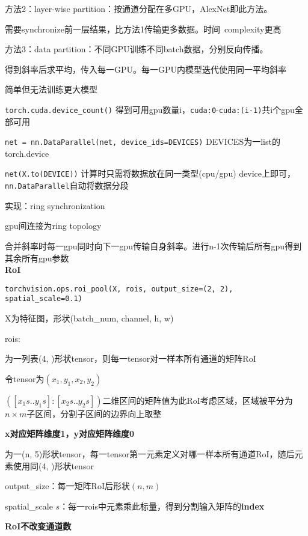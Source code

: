 \documentclass[UTF8]{ctexart}
\begin{document}
  方法2：layer-wise partition：按通道分配在多GPU，AlexNet即此方法。
  
  \quad 需要synchronize前一层结果，比方法1传输更多数据。时间\ complexity更高

  方法3：data partition：不同GPU训练不同batch数据，分别反向传播。

  \quad 得到斜率后求平均，传入每一GPU。每一GPU内模型迭代使用同一平均斜率
  
  \quad 简单但无法训练更大模型

  \quad \texttt{torch.cuda.device\_count()} 得到可用gpu数量i，\texttt{cuda:0}-\texttt{cuda:(i-1)}共i个gpu全部可用

  \quad \texttt{net = nn.DataParallel(net, device\_ids=DEVICES)} DEVICES为一list的torch.device

  \quad \texttt{net(X.to(DEVICE))} 计算时只需将数据放在同一类型(cpu/gpu) device上即可，\texttt{nn.DataParallel}自动将数据分段

  \quad 实现：ring synchronization 

  \quad \quad gpu间连接为ring topology
  
  \quad \quad 合并斜率时每一gpu同时向下一gpu传输自身斜率。进行n-1次传输后所有gpu得到其余所有gpu参数\\
\textbf{RoI}

  \texttt{torchvision.ops.roi\_pool(X, rois, output\_size=(2, 2), spatial\_scale=0.1)}

  \quad X为特征图，形状(batch\_num, channel, h, w)

  \quad rois:

  \quad \quad 为一列表(4, )形状tensor，则每一tensor对一样本所有通道的矩阵RoI

  \quad \quad \quad 令tensor为$(x_1, y_1, x_2, y_2)$

  \quad \quad \quad $([x_1 s .. y_1 s]: [x_2 s .. y_2 s])$二维区间的矩阵值为此RoI考虑区域，区域被平分为$n \times m$子区间，分割子区间的边界向上取整

  \quad \quad \quad \textbf{x对应矩阵维度1，y对应矩阵维度0}

  \quad \quad 为一(n, 5)形状tensor，每一tensor第一元素定义对哪一样本所有通道RoI，随后元素使用同(4, )形状tensor

  \quad output\_size：每一矩阵RoI后形状$(n, m)$

  \quad spatial\_scale $s$：每一rois中元素乘此标量，得到分割输入矩阵的\textbf{index}

  \textbf{RoI不改变通道数}

\end{document}
